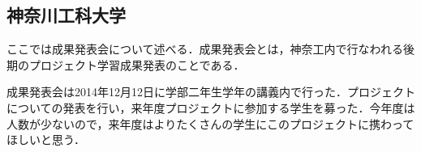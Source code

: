\subsection{神奈川工科大学} 
\par ここでは成果発表会について述べる．成果発表会とは，神奈工内で行なわれる後期のプロジェクト学習成果発表のことである．
\par 成果発表会は2014年12月12日に学部二年生学年の講義内で行った．プロジェクトについての発表を行い，来年度プロジェクトに参加する学生を募った．今年度は人数が少ないので，来年度はよりたくさんの学生にこのプロジェクトに携わってほしいと思う．
\par 
